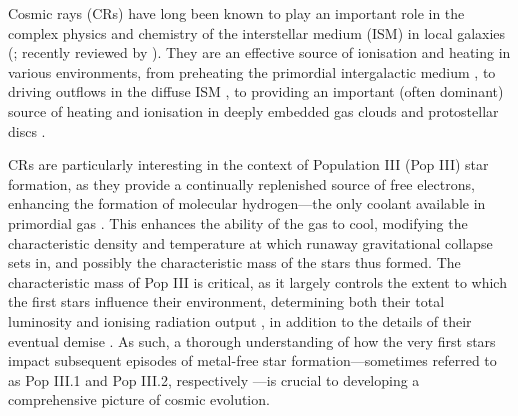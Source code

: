\documentclass[usenatbib]{mn2e}
\begin{document}
Cosmic rays (CRs) have long been known to play an important role in the complex physics and chemistry of the interstellar medium (ISM) in local galaxies (\citealt{SpitzerTomasko1968,SpitzerScott1969,GlassgoldLanger1973,GoldsmithLanger1978,CravensDalgarno1978,MannheimSchlickeiser1994,Tielens2005}; recently reviewed by \citealt{StrongMoskalenkoPtuskin2007,GrenierBlackStrong2015}).  
They are an effective source of ionisation and heating in various environments, from preheating the primordial intergalactic medium  \citep[IGM;][]{SazonovSunyaev2015}, to driving outflows in the diffuse ISM \citep[e.g.,][]{Ensslinetal2007,Jubelgasetal2008,SalemBryan2014,Hanaszetal2013,Boothetal2013,SalemBryanHummels2014}, to providing an important (often dominant) source of heating and ionisation in deeply embedded gas clouds and protostellar discs \citep{Spitzer1978,DalgarnoYanLiu1999,IndrioloFieldsMcCall2009,PadovaniGalliGlassgold2009,GlassgoldGalliPadovani2012,PadovaniHennebelleGalli2013,Padovanietal2015}. 

CRs are particularly interesting in the context of Population III (Pop III) star formation, as they provide a continually replenished source of free electrons, enhancing the formation of molecular hydrogen---the only coolant available in primordial gas \citep{Abeletal1997,GalliPalla1998,BrommCoppiLarson2002}.  
This enhances the ability of the gas to cool, modifying the characteristic density and temperature at which runaway gravitational collapse sets in, and possibly the characteristic mass of the stars thus formed.   
The characteristic mass of Pop III is critical, as it largely controls the extent to which the first stars influence their environment, determining both their total luminosity and ionising radiation output \citep{Schaerer2002}, in addition to the details of their eventual demise \citep{Hegeretal2003,HegerWoosley2010,MaederMeynet2012}. 
As such, a thorough understanding of how the very first stars impact subsequent episodes of metal-free star formation---sometimes referred to as Pop III.1 and Pop III.2, respectively \citep{McKeeTan2008}---is crucial to developing a comprehensive picture of cosmic evolution.
\end{document}
